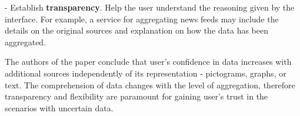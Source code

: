 \documentclass[12pt,letterpaper]{article}
\begin{document}
\hspace{10mm} - Establish \textbf{transparency}. Help the user understand the reasoning given by the interface. For example, a service for aggregating news feeds may include the details on the original sources and explanation on how the data has been aggregated. 

The authors of the paper conclude that user's confidence in data increases with additional sources independently of its representation - pictograms, graphs, or text. The comprehension of data changes with the level of aggregation, therefore transparency and flexibility are paramount for gaining user's trust in the scenarios with uncertain data. 

 

\end{document}
